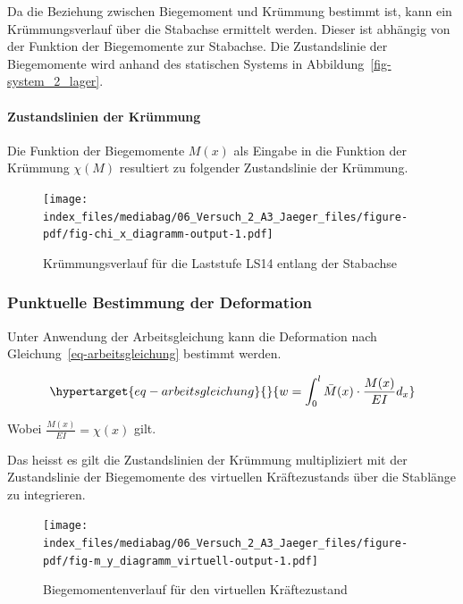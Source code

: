\documentclass[
  12pt,
  letterpaper,
  egregdoesnotlikesansseriftitles]{scrreprt}
\let\oldparagraph\paragraph
\renewcommand{\paragraph}[1]{\oldparagraph{#1}\mbox{}}
\begin{document}
Da die Beziehung zwischen Biegemoment und Krümmung bestimmt ist, kann
ein Krümmungsverlauf über die Stabachse ermittelt werden. Dieser ist
abhängig von der Funktion der Biegemomente zur Stabachse. Die
Zustandslinie der Biegemomente wird anhand des statischen Systems in
Abbildung~\ref{fig-system_2_lager}.

\hypertarget{zustandslinien-der-kruxfcmmung}{%
\paragraph{Zustandslinien der
Krümmung}\label{zustandslinien-der-kruxfcmmung}}

Die Funktion der Biegemomente \(M(x)\) als Eingabe in die Funktion der
Krümmung \(\chi(M)\) resultiert zu folgender Zustandslinie der Krümmung.

\begin{figure}[H]

{\centering \texttt{[image: index\_files/mediabag/06\_Versuch\_2\_A3\_Jaeger\_files/figure-pdf/fig-chi\_x\_diagramm-output-1.pdf]}

}

\caption{\label{fig-chi_x_diagramm}Krümmungsverlauf für die Laststufe
LS14 entlang der Stabachse}

\end{figure}

\hypertarget{punktuelle-bestimmung-der-deformation}{%
\subsubsection{Punktuelle Bestimmung der
Deformation}\label{punktuelle-bestimmung-der-deformation}}

Unter Anwendung der Arbeitsgleichung kann die Deformation nach
Gleichung~\ref{eq-arbeitsgleichung} bestimmt werden.

\begin{equation}\protect\hypertarget{eq-arbeitsgleichung}{}{
w = \int_0^l \bar{M}(x) \cdot \frac{M(x)}{EI} d_x
}\label{eq-arbeitsgleichung}\end{equation}

Wobei \(\frac{M(x)}{EI} = \chi(x)\) gilt.

Das heisst es gilt die Zustandslinien der Krümmung multipliziert mit der
Zustandslinie der Biegemomente des virtuellen Kräftezustands über die
Stablänge zu integrieren.

\begin{figure}[H]

{\centering \texttt{[image: index\_files/mediabag/06\_Versuch\_2\_A3\_Jaeger\_files/figure-pdf/fig-m\_y\_diagramm\_virtuell-output-1.pdf]}

}

\caption{\label{fig-m_y_diagramm_virtuell}Biegemomentenverlauf für den
virtuellen Kräftezustand}

\end{figure}
\end{document}
